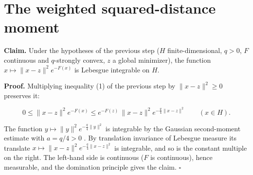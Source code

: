 \documentclass[11pt,a4paper]{article}
\begin{document}
\section{\texorpdfstring{The weighted squared-distance moment}{The weighted squared-distance moment}}


\textbf{Claim.} Under the hypotheses of the previous step (\(H\) finite-dimensional, \(q>0\), \(F\) continuous and \(q\)-strongly convex, \(z\) a global minimizer), the function \(x\mapsto\|x-z\|^2e^{-F(x)}\) is Lebesgue integrable on \(H\).




\textbf{Proof.} Multiplying inequality (1) of the previous step by \(\|x-z\|^2\ge0\) preserves it:


\[0\le\|x-z\|^2e^{-F(x)}\le e^{-F(z)}\,\|x-z\|^2e^{-\frac q4\|x-z\|^2}\qquad(x\in H).\]


The function \(y\mapsto\|y\|^2e^{-\frac q4\|y\|^2}\) is integrable by the Gaussian second-moment estimate with \(a=q/4>0\) \cite[Section~3.26.7]{LangevinLean2026ULASC}. By translation invariance of Lebesgue measure its translate \(x\mapsto\|x-z\|^2e^{-\frac q4\|x-z\|^2}\) is integrable, and so is the constant multiple on the right. The left-hand side is continuous (\(F\) is continuous), hence measurable, and the domination principle gives the claim. \(\square\)
\end{document}
